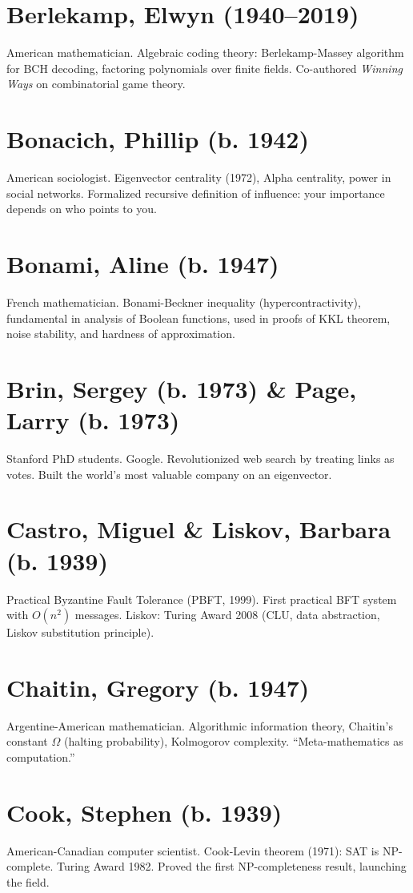 \section*{Berlekamp, Elwyn (1940--2019)}
American mathematician. Algebraic coding theory: Berlekamp-Massey algorithm for BCH decoding, factoring polynomials over finite fields. Co-authored \emph{Winning Ways} on combinatorial game theory.

\section*{Bonacich, Phillip (b. 1942)}
American sociologist. Eigenvector centrality (1972), Alpha centrality, power in social networks. Formalized recursive definition of influence: your importance depends on who points to you.

\section*{Bonami, Aline (b. 1947)}
French mathematician. Bonami-Beckner inequality (hypercontractivity), fundamental in analysis of Boolean functions, used in proofs of KKL theorem, noise stability, and hardness of approximation.

\section*{Brin, Sergey (b. 1973) \& Page, Larry (b. 1973)}
Stanford PhD students. Google. Revolutionized web search by treating links as votes. Built the world's most valuable company on an eigenvector.

\section*{Castro, Miguel \& Liskov, Barbara (b. 1939)}
Practical Byzantine Fault Tolerance (PBFT, 1999). First practical BFT system with $O(n^2)$ messages. Liskov: Turing Award 2008 (CLU, data abstraction, Liskov substitution principle).

\section*{Chaitin, Gregory (b. 1947)}
Argentine-American mathematician. Algorithmic information theory, Chaitin's constant $\Omega$ (halting probability), Kolmogorov complexity. ``Meta-mathematics as computation.''

\section*{Cook, Stephen (b. 1939)}
American-Canadian computer scientist. Cook-Levin theorem (1971): SAT is NP-complete. Turing Award 1982. Proved the first NP-completeness result, launching the field.


